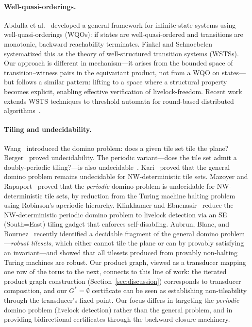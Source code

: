 \documentclass[11pt]{article}
\begin{document}
\paragraph{Well-quasi-orderings.} Abdulla et al.~\cite{abdulla-wqo} developed a general framework for infinite-state systems using well-quasi-orderings (WQOs): if states are well-quasi-ordered and transitions are monotonic, backward reachability terminates. Finkel and Schnoebelen~\cite{finkel-wsts} systematized this as the theory of well-structured transition systems (WSTSs). Our approach is different in mechanism---it arises from the bounded space of transition--witness pairs in the equivariant product, not from a WQO on states---but follows a similar pattern: lifting to a space where a structural property becomes explicit, enabling effective verification of livelock-freedom. Recent work extends WSTS techniques to threshold automata for round-based distributed algorithms~\cite{baumeister-jacobs}.

\paragraph{Tiling and undecidability.} Wang~\cite{wang-tiles} introduced the domino problem: does a given tile set tile the plane? Berger~\cite{berger} proved undecidability. The periodic variant---does the tile set admit a doubly-periodic tiling?---is also undecidable~\cite{gurevich-koryakov}. Kari~\cite{kari-aperiodic} proved that the general domino problem remains undecidable for NW-deterministic tile sets. Mazoyer and Rapaport~\cite{mazoyer-rapaport} proved that the \emph{periodic} domino problem is undecidable for NW-deterministic tile sets, by reduction from the Turing machine halting problem using Robinson's aperiodic hierarchy. Klinkhamer and Ebnenasir~\cite{klinkhamer-ebnenasir} reduce the NW-deterministic periodic domino problem to livelock detection via an SE (South=East) tiling gadget that enforces self-disabling. Aubrun, Blanc, and Bournez~\cite{aubrun-robust} recently identified a decidable fragment of the general domino problem---\emph{robust tilesets}, which either cannot tile the plane or can by provably satisfying an invariant---and showed that all tilesets produced from provably non-halting Turing machines are robust. Our product graph, viewed as a transducer mapping one row of the torus to the next, connects to this line of work: the iterated product graph construction (Section~\ref{sec:discussion}) corresponds to transducer composition, and our $G^* = \emptyset$ certificate can be seen as establishing non-tileability through the transducer's fixed point. Our focus differs in targeting the \emph{periodic} domino problem (livelock detection) rather than the general problem, and in providing bidirectional certificates through the backward-closure machinery.
\end{document}
